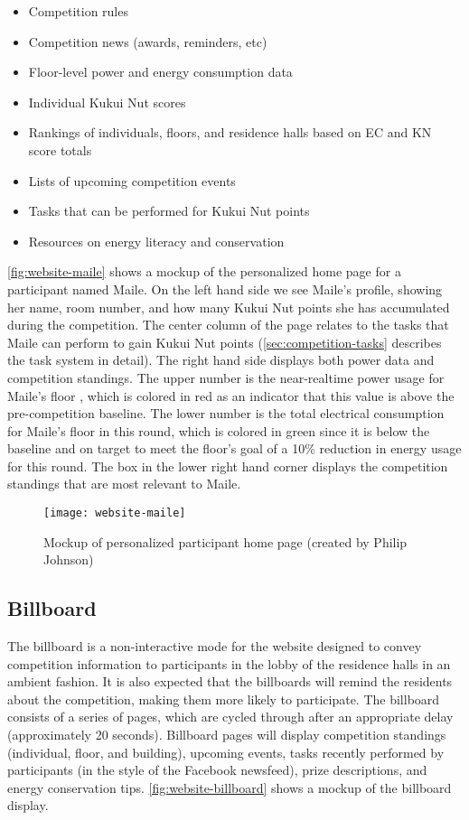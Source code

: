 \begin{itemize}
	\item Competition rules
	\item Competition news (awards, reminders, etc)
	\item Floor-level power and energy consumption data
	\item Individual Kukui Nut scores
	\item Rankings of individuals, floors, and residence halls based on EC and KN score totals
	\item Lists of upcoming competition events
	\item Tasks that can be performed for Kukui Nut points
	\item Resources on energy literacy and conservation
\end{itemize}

\autoref{fig:website-maile} shows a mockup of the personalized home page for a participant named Maile. On the left hand side we see Maile's profile, showing her name, room number, and how many Kukui Nut points she has accumulated during the competition. The center column of the page relates to the tasks that Maile can perform to gain Kukui Nut points (\autoref{sec:competition-tasks} describes the task system in detail). The right hand side displays both power data and competition standings. The upper number is the near-realtime power usage for Maile's floor , which is colored in red as an indicator that this value is above the pre-competition baseline. The lower number is the total electrical consumption for Maile's floor in this round, which is colored in green since it is below the baseline and on target to meet the floor's goal of a 10\% reduction in energy usage for this round. The box in the lower right hand corner displays the competition standings that are most relevant to Maile.

\begin{figure}[htb]
	\centering
		\texttt{[image: website-maile]}
		\caption{Mockup of personalized participant home page (created by Philip Johnson)}
		\label{fig:website-maile}
\end{figure}

\subsection{Billboard}
\label{sec:billboard-design}

The billboard is a non-interactive mode for the website designed to convey competition information to participants in the lobby of the residence halls in an ambient fashion. It is also expected that the billboards will remind the residents about the competition, making them more likely to participate. The billboard consists of a series of pages, which are cycled through after an appropriate delay (approximately 20 seconds). Billboard pages will display competition standings (individual, floor, and building), upcoming events, tasks recently performed by participants (in the style of the Facebook newsfeed), prize descriptions, and energy conservation tips. \autoref{fig:website-billboard} shows a mockup of the billboard display.

